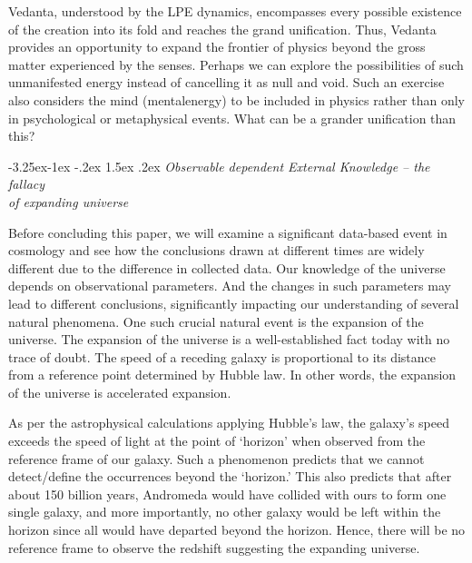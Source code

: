 \documentclass[twoside, 13pt]{article}
\makeatletter
\renewcommand\subsection{\@startsection{subsection}{2}{\z@}%
                                     {-3.25ex\@plus -1ex \@minus -.2ex}%
                                     {1.5ex \@plus .2ex}%
                                     {\normalfont\Large\bfseries}}
\makeatother
\begin{document}
{{{Vedanta, understood by the LPE dynamics, encompasses every possible existence of the creation into its fold and reaches the grand unification. Thus, Vedanta provides an opportunity to expand the frontier of physics beyond the gross matter experienced by the senses. Perhaps we can explore the possibilities of such unmanifested energy instead of cancelling it as null and void. Such an exercise also considers the mind (mental\break energy) to be included in physics rather than only in psychological or metaphysical events. What can be a grander unification than this?}


{\fontsize{8}{10}\selectfont\subsection{\textit{Observable dependent External Knowledge – the fallacy\\ of expanding universe}}}\label{subsec-4.3}

{\fontsize{12}{14}\selectfont Before concluding this paper, we will examine a significant data-based event in cosmology and see how the conclusions drawn at different times are widely different due to the difference in collected data. Our knowledge of the universe depends on observational parameters. And the changes in such parameters may lead to different conclusions, significantly impacting our understanding of several natural phenomena. One such crucial natural event is the expansion of the universe. The expansion of the universe is a well-established fact today with no trace of doubt. The speed of a receding galaxy is proportional to its distance from a reference point determined by Hubble law. In other words, the expansion of the universe is accelerated expansion.

As per the astrophysical calculations applying Hubble’s law, the galaxy's speed exceeds the speed of light at the point of ‘horizon’ when observed from the reference frame of our galaxy. Such a phenomenon predicts that we cannot detect/define the occurrences beyond the ‘horizon.’ This also predicts that after about 150 billion years, Andromeda would have collided with ours to form one single galaxy, and more importantly, no other galaxy would be left within the horizon since all would have departed beyond the horizon. Hence, there will be no reference frame to observe the redshift suggesting the expanding universe. 

}}}
\end{document}
